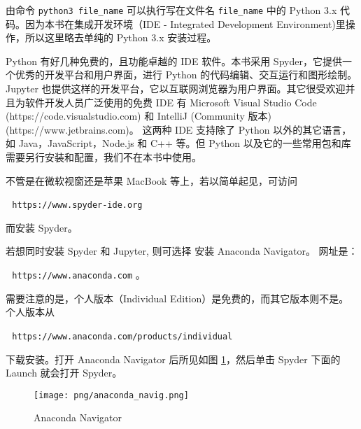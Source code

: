 \documentclass[main.tex]{subfiles}
\begin{document}
\noindent 由命令 \texttt{python3 file\_name} 可以执行写在文件名
\texttt{file\_name} 中的 Python 3.x 代码。因为本书在集成开发环境（IDE - Integrated Development Environment)里操作，所以这里略去单纯的 Python 3.x 安装过程。

Python 有好几种免费的，且功能卓越的 IDE 软件。本书采用 Spyder，它提供一个优秀的开发平台和用户界面，进行 Python 的代码编辑、交互运行和图形绘制。Jupyter 也提供这样的开发平台，它以互联网浏览器为用户界面。其它很受欢迎并且为软件开发人员广泛使用的免费 IDE 有 Microsoft Visual Studio Code (https://code.visualstudio.com) 和 IntelliJ (Community 版本) (https://www.jetbrains.com)。
这两种 IDE 支持除了 Python 以外的其它语言，如 Java，JavaScript，Node.js 和 C++ 等。但 Python 以及它的一些常用包和库需要另行安装和配置，我们不在本书中使用。  


不管是在微软视窗还是苹果 MacBook 等上，若以简单起见，可访问

\,\,\,\,\texttt{https://www.spyder-ide.org} 

\noindent 而安装 Spyder。

若想同时安装 Spyder 和 Jupyter, 则可选择 
安装 Anaconda Navigator。 网址是：

\,\,\,\,\texttt{https://www.anaconda.com} 。

\noindent 需要注意的是，个人版本（Individual Edition）是免费的，而其它版本则不是。个人版本从

\,\,\,\,\texttt{https://www.anaconda.com/products/individual} 

\noindent 下载安装。打开 Anaconda Navigator 后所见如图 \ref{fig:2.1.1}，然后单击 Spyder 下面的 Launch 就会打开 Spyder。

\begin{figure}[h]
	\texttt{[image: png/anaconda\_navig.png]}
	\caption{Anaconda Navigator}\label{fig:2.1.1}
\end{figure}
\end{document}
